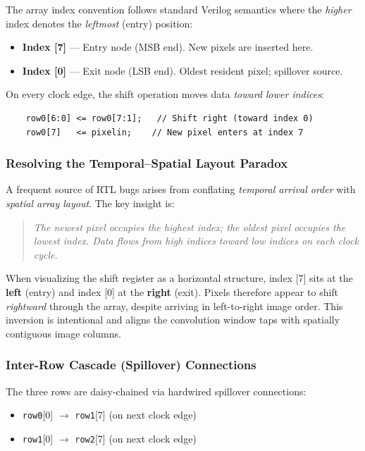 \documentclass[11pt,a4paper]{report}
\begin{document}
The array index convention follows standard Verilog semantics where the \emph{higher} index denotes the \emph{leftmost} (entry) position:

\begin{itemize}[leftmargin=2em]
    \item \textbf{Index [7]} --- Entry node (MSB end). New pixels are inserted here.
    \item \textbf{Index [0]} --- Exit node (LSB end). Oldest resident pixel; spillover source.
\end{itemize}

On every clock edge, the shift operation moves data \emph{toward lower indices}:

\begin{verbatim}
    row0[6:0] <= row0[7:1];   // Shift right (toward index 0)
    row0[7]   <= pixelin;    // New pixel enters at index 7
\end{verbatim}

\subsubsection{Resolving the Temporal--Spatial Layout Paradox}

A frequent source of RTL bugs arises from conflating \emph{temporal arrival order} with \emph{spatial array layout}. The key insight is:

\begin{quote}
\emph{The newest pixel occupies the highest index; the oldest pixel occupies the lowest index. Data flows from high indices toward low indices on each clock cycle.}
\end{quote}

When visualizing the shift register as a horizontal structure, index [7] sits at the \textbf{left} (entry) and index [0] at the \textbf{right} (exit). Pixels therefore appear to shift \emph{rightward} through the array, despite arriving in left-to-right image order. This inversion is intentional and aligns the convolution window taps with spatially contiguous image columns.

\subsubsection{Inter-Row Cascade (Spillover) Connections}

The three rows are daisy-chained via hardwired spillover connections:

\begin{itemize}[leftmargin=2em]
    \item \texttt{row0}[0] $\rightarrow$ \texttt{row1}[7] (on next clock edge)
    \item \texttt{row1}[0] $\rightarrow$ \texttt{row2}[7] (on next clock edge)
\end{itemize}
\end{document}
